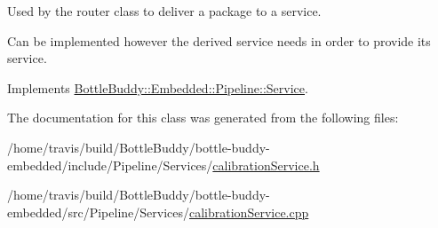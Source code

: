 Used by the router class to deliver a package to a service. 

Can be implemented however the derived service needs in order to provide its service. 

Implements \hyperlink{class_bottle_buddy_1_1_embedded_1_1_pipeline_1_1_service_aaa0ee18450e47f2ad51d9934a2d61992}{Bottle\+Buddy\+::\+Embedded\+::\+Pipeline\+::\+Service}.



The documentation for this class was generated from the following files\+:\begin{DoxyCompactItemize}
\item 
/home/travis/build/\+Bottle\+Buddy/bottle-\/buddy-\/embedded/include/\+Pipeline/\+Services/\hyperlink{calibration_service_8h}{calibration\+Service.\+h}\item 
/home/travis/build/\+Bottle\+Buddy/bottle-\/buddy-\/embedded/src/\+Pipeline/\+Services/\hyperlink{calibration_service_8cpp}{calibration\+Service.\+cpp}\end{DoxyCompactItemize}
